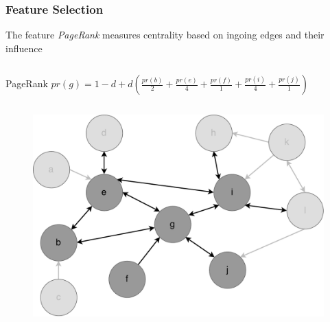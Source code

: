 \begin{frame}
\frametitle{Feature Selection}
The feature \textit{PageRank} measures centrality based on ingoing edges and their influence
\begin{columns}
\begin{column}{0.8\textwidth}\centering
	\begin{block}{\small PageRank}\centering
		$pr(g) = 1-d + d(\frac{pr(b)}{2}+\frac{pr(e)}{4} + \frac{pr(f)}{1} + \frac{pr(i)}{4} + \frac{pr(j)}{1})$
	\end{block}
\end{column}
\end{columns}
\begin{figure}
	\includegraphics[scale=0.32]{graphics/directed_network_example_pagerank.pdf}
\end{figure}

\end{frame}

